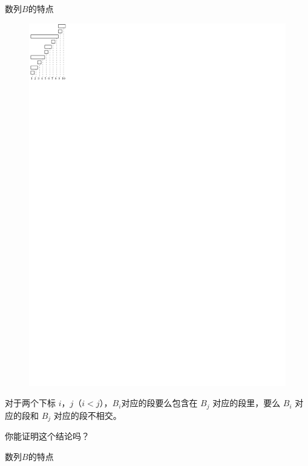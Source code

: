 \documentclass{ctexbeamer}
\begin{document}
\begin{frame}{数列$B$的特点}

\begin{figure}
    \centering
    \includegraphics{imgs/bit}
\end{figure}

\begin{tcolorbox}
  对于两个下标 $i$，$j$（$i < j$），$B_i$对应的段要么包含在 $B_j$ 对应的段里，要么 $B_i$ 对应的段和 $B_j$ 对应的段不相交。
\end{tcolorbox}


你能证明这个结论吗？

\end{frame}


\begin{frame}{数列$B$的特点}

\end{frame}
\end{document}
